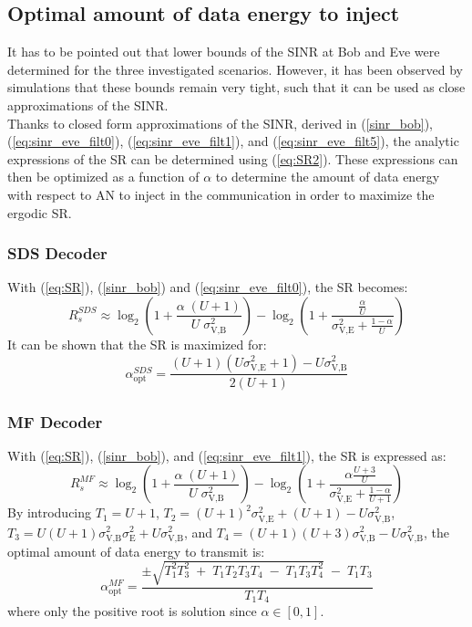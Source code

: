 \documentclass[journal,comsoc]{IEEEtran}
\begin{document}
\subsection{Optimal amount of data energy to inject}
\label{subsec:best_alpha}
It has to be pointed out that lower bounds of the SINR at Bob and Eve were determined for the three investigated scenarios. However, it has been observed by simulations that these bounds remain very tight, such that it can be used as close approximations of the SINR.\\
Thanks to closed form approximations of the SINR, derived in (\ref{sinr_bob}),  (\ref{eq:sinr_eve_filt0}), (\ref{eq:sinr_eve_filt1}), and (\ref{eq:sinr_eve_filt5}), the analytic expressions of the SR can be determined using (\ref{eq:SR2}). These expressions can then be optimized as a function of $\alpha$ to determine the amount of data energy with respect to AN to inject in the communication in order to maximize the ergodic SR.
\subsubsection{SDS Decoder}
 With (\ref{eq:SR}), (\ref{sinr_bob}) and (\ref{eq:sinr_eve_filt0}), the SR becomes:
\begin{equation}
R_s^{SDS} \approx \log_2 \left( 1 +  \frac{\alpha \;(U+1)}{U \; \sigma_{\text{V,B}}^2} \right) - \log_2\left( 1 + \frac{\frac{\alpha}{U}}{\sigma^2_{\text{V,E}}+\frac{1-\alpha}{U}}\right)
\label{eq:SR_anal2_decod_0}
\end{equation}
It can be shown that the SR is maximized for:
\begin{equation}
\alpha_{\text{opt}}^{SDS} = \frac{(U+1)(U\sigma_{\text{V,E}}^2 + 1)- U\sigma_{\text{V,B}}^2}{2(U+1)}
\label{eq:optimal_alpha_decod_0}
\end{equation}


\subsubsection{MF Decoder}
With (\ref{eq:SR}), (\ref{sinr_bob}), and (\ref{eq:sinr_eve_filt1}), the SR is expressed as:
\begin{equation}
R_s^{MF} \approx \log_2 \left( 1 +  \frac{\alpha \;(U+1)}{U \; \sigma_{\text{V,B}}^2} \right) - \log_2\left( 1 +  \frac{\alpha \frac{U+3}{U}}{\sigma^2_{\text{V,E}} + \frac{1-\alpha}{U+1}}\right)
\label{eq:SR_anal2_decod_1}
\end{equation}
By introducing $T_1 = U+1$, $T_2 = (U+1)^2\sigma_{\text{V,E}}^2 + (U+1) - U\sigma_{\text{V,B}}^2$, $T_3 = U(U+1)\sigma_{\text{V,B}}^2\sigma_{\text{E}}^2 + U \sigma_{\text{V,B}}^2$, and $T_4=(U+1)(U+3)\sigma_{\text{V,B}}^2-U\sigma_{\text{V,B}}^2$, the optimal amount of data energy to transmit is: 
\begin{equation}
\alpha_{\text{opt}}^{MF} = \frac{\pm\sqrt{T_1^2 T_3^2 \; + \; T_1 T_2 T_3 T_4 \; - \; T_1 T_3 T_4^2} \; - \; T_1 T_3}{T_1 T_4}
\label{eq:optimal_alpha_decod_1}
\end{equation}
where only the positive root is solution since $\alpha \in [0,1]$.
\end{document}

